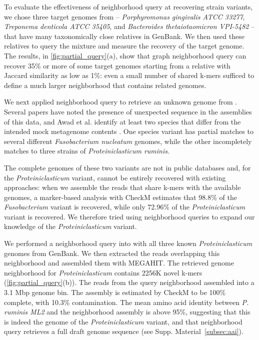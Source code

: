 To evaluate the effectiveness of neighborhood query at recovering
strain variants,
we chose three target genomes from \podarv -- {\em Porphyromonas
  gingivalis ATCC 33277}, {\em Treponema denticola ATCC 35405}, and
{\em Bacteroides thetaiotaomicron VPI-5482} -- that have many
taxonomically close relatives in GenBank. We then used these relatives
to query the \podarv mixture and measure the recovery of the target
genome.  The results, in \autoref{fig:partial_query}(a), show that
graph neighborhood query can recover 35\% or more of some target genomes
starting from a relative with Jaccard similarity as low as 1\%: even a
small number of shared k-mers sufficed to define a much larger neighborhood
that contains related genomes.


We next applied neighborhood query to retrieve an unknown genome from \podarv.
Several papers have noted the
presence of unexpected sequence in the assemblies of this data, and
Awad et al. identify at least two species that differ from
the intended mock metagenome contents \cite{megahit,Awad155358}.  One species
variant has partial matches to several different {\em
  Fusobacterium nucleatum} genomes, while the other incompletely matches to
three strains of
{\em Proteiniclasticum ruminis}.

The complete genomes of these two variants are not in public databases and, for
the {\em Proteiniclasticum} variant, cannot
be entirely recovered with existing approaches: when we
assemble the reads that share k-mers with the available genomes, a
marker-based analysis with CheckM estimates that 98.8\% of the {\em
  Fusobacterium} variant is recovered, while only 72.96\% of the {\em
  Proteiniclasticum} variant is recovered. We therefore tried using
neighborhood queries to expand our knowledge of the {\em Proteiniclasticum} variant.

We performed a neighborhood query into \podarv with all three known {\em
  Proteiniclasticum} genomes from GenBank.  We then extracted the reads
overlapping this neighborhood and assembled them with MEGAHIT.  The
retrieved genome neighborhood for {\em Proteiniclasticum} contains
2256K novel k-mers (\autoref{fig:partial_query}(b)). The reads from
the query neighborhood assembled into a 3.1 Mbp genome bin. The
assembly is estimated by CheckM to be 100\% complete, with 10.3\%
contamination.
The mean amino acid identity between {\em P. ruminis ML2} and the
neighborhood assembly is above 95\%, suggesting that this is indeed
the genome of the {\em Proteiniclasticum} variant, and that
neighborhood query retrieves a full draft genome sequence (see Supp. Material~\ref{subsec:aai}).

